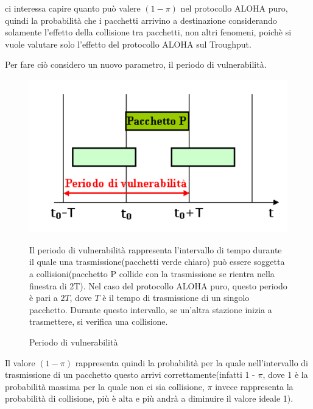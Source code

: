 ci interessa capire quanto può valere $(1 - \pi)$ nel protocollo ALOHA puro, quindi la probabilità che i pacchetti arrivino a destinazione considerando solamente l'effetto della collisione tra pacchetti, non altri fenomeni, poichè si vuole valutare solo l'effetto del protocollo ALOHA sul Troughput.

Per fare ciò considero un nuovo parametro, il periodo di vulnerabilità.

\begin{figure}[htbp]
    \centering
    \begin{minipage}{0.45\textwidth}
        \includegraphics[width=\linewidth]{images/periodovulnerabilita.png}
        \caption{Periodo di vulnerabilità}
        \label{fig:periodo-vulnerabilita}
    \end{minipage}%
    \hfill
    \begin{minipage}{0.5\textwidth}
        Il periodo di vulnerabilità rappresenta l'intervallo di tempo durante il quale una trasmissione(pacchetti verde chiaro) può essere soggetta a collisioni(pacchetto P collide con la trasmissione se rientra nella finestra di 2T). Nel caso del protocollo ALOHA puro, questo periodo è pari a $2T$, dove $T$ è il tempo di trasmissione di un singolo pacchetto. Durante questo intervallo, se un'altra stazione inizia a trasmettere, si verifica una collisione.
    \end{minipage}
\end{figure}

Il valore $(1 - \pi)$ rappresenta quindi la probabilità per la quale nell'intervallo di trasmissione di un pacchetto questo arrivi correttamente(infatti 1 - $\pi$, dove 1 è la probabilità massima per la quale non ci sia collisione, $\pi$ invece rappresenta la probabilità di collisione, più è alta e più andrà a diminuire il valore ideale 1).


